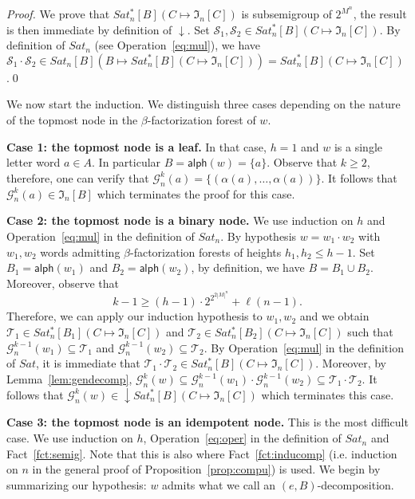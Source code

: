 \documentclass[envcountsame]{llncs}
\newcommand\Gs{\ensuremath{\mathcal{G}}\xspace}
\newcommand\Ss{\ensuremath{\mathcal{S}}\xspace}
\newcommand\Ts{\ensuremath{\mathcal{T}}\xspace}
\let\leq\leqslant
\let\geq\geqslant
\newcommand\content[1]{\ensuremath{\contentmorphism(#1)}}
\newcommand\contentmorphism{\ensuremath{\textsf{alph}}}
\newcommand\fI{\ensuremath{\mathfrak I}\xspace}
\DeclareMathOperator{\downclos}{\downarrow}
\begin{document}
\begin{proof}
  We prove that $Sat^{*}_n[B](C \mapsto \fI_n[C])$ is subsemigroup of
  $2^{M^n}$, the result is then immediate by definition of $\downclos$.
  Set $\Ss_1,\Ss_2 \in Sat^{*}_n[B](C \mapsto \fI_n[C])$. By definition
  of $Sat_n$ (see Operation~\eqref{eq:mul}), we have $\Ss_1 \cdot \Ss_2
  \in Sat_n[B](B \mapsto Sat^{*}_n[B](C \mapsto \fI_n[C])) =
  Sat^{*}_n[B](C \mapsto \fI_n[C])$.\qed
\end{proof}

We now start the induction. We distinguish three cases depending on
the nature of the topmost node in the $\beta$-factorization forest of
$w$.

\medskip
\noindent
{\bf Case 1: the topmost node is a leaf.} In that case, $h = 1$ and
$w$ is a single letter word $a \in A$. In particular $B = \content{w}
= \{a\}$. Observe that $k \geq 2$, therefore, one can verify that
$\Gs_n^k(a) = \{(\alpha(a),\dots,\alpha(a))\}$. It follows that
$\Gs_n^k(a) \in \fI_n[B]$ which terminates the proof for this  
case.

\medskip
\noindent
{\bf Case 2: the topmost node is a binary node.} We use induction on
$h$ and Operation~\eqref{eq:mul} in the definition of $Sat_n$. By
hypothesis $w = w_1 \cdot w_2$ with $w_1,w_2$ words admitting 
$\beta$-factorization forests of heights $h_1,h_2 \leq
h-1$. Set $B_1 = \content{w_1}$ and $B_2 = \content{w_2}$, by definition,
we have $B = B_1 \cup B_2$. Moreover, observe that
\[
k - 1 \geq (h-1) \cdot 2^{2^{2|M|^n}} + \ell(n-1).
\]
Therefore, we can apply our induction hypothesis to $w_1,w_2$ and we
obtain $\Ts_1 \in Sat^{*}_n[B_1](C \mapsto \fI_n[C])$ and $\Ts_2 \in
Sat^{*}_n[B_2](C \mapsto \fI_n[C])$ such that $\Gs_n^{k-1}(w_1)
\subseteq \Ts_1$ and $\Gs_n^{k-1}(w_2) \subseteq \Ts_2$. By
Operation~\eqref{eq:mul} in the definition of $Sat$, it is immediate
that $\Ts_1 \cdot \Ts_2 \in Sat^{*}_n[B](C \mapsto
\fI_n[C])$. Moreover, by Lemma~\ref{lem:gendecomp}, $\Gs_n^k(w)
\subseteq \Gs_n^{k-1}(w_1) \cdot \Gs_n^{k-1}(w_2) \subseteq \Ts_1
\cdot \Ts_2$. It follows that $\Gs_n^k(w) \in \downclos Sat^{*}_n[B](C
\mapsto \fI_n[C])$ which terminates this case.


\medskip
\noindent
{\bf Case 3: the topmost node is an idempotent node.} This is the 
most difficult case. We use induction on $h$,
Operation~\eqref{eq:oper} in the definition of $Sat_n$ and
Fact~\ref{fct:semig}. Note that this is also where
Fact~\ref{fct:inducomp} (i.e. induction on $n$ in the general proof of
Proposition~\ref{prop:compu}) is used. We begin by summarizing our
hypothesis: $w$ admits what we call an $(e,B)$-decomposition.
\end{document}
